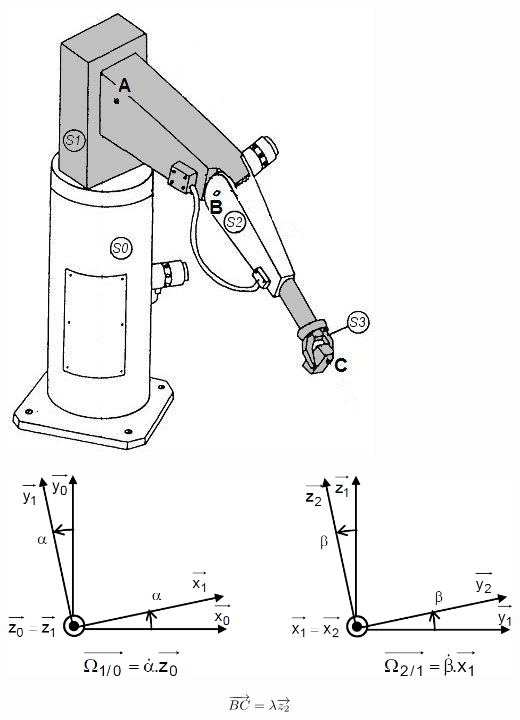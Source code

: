 \documentclass[10pt,oneside]{article}
\begin{document}
\begin{minipage}[c]{.5\linewidth}

\begin{center}
\includegraphics[width=.7\textwidth]{png/bras1}
\end{center}

\begin{center}
\includegraphics[width=\textwidth]{png/parametrage}
\end{center}

$$\overrightarrow{BC}=\lambda\overrightarrow{z_2}$$

\end{minipage}


%
%
%
\end{document}
